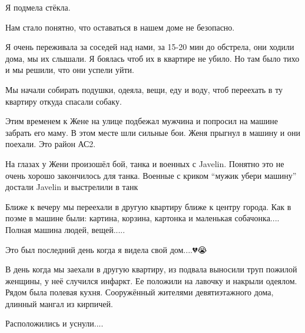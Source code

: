 
Я подмела стёкла.

Нам стало понятно, что оставаться в нашем доме не безопасно. 

Я очень переживала за соседей над нами, за 15-20 мин до обстрела, они ходили
дома, мы их слышали. Я боялась чтоб их в квартире не убило. Но там было тихо и
мы решили, что они успели уйти. 


Мы начали собирать подушки, одеяла, вещи, еду и воду, чтоб переехать в ту
квартиру откуда спасали собаку. 

Этим временем к Жене на улице подбежал мужчина и попросил на машине забрать его
маму. В этом месте шли сильные бои. Женя прыгнул в машину и они поехали. Это
район АС2. 

На глазах у Жени произошёл бой, танка и военных с Javelin. Понятно это не очень
хорошо закончилось для танка. Военные с криком \enquote{мужик убери машину} достали
Javelin и выстрелили в танк

Ближе к вечеру мы переехали в другую квартиру ближе к центру города. Как в
поэме в машине были: картина, корзина, картонка и маленькая собачонка....  Полная
машина людей, вещей.....


Это был последний день когда я видела свой дом....💔😭

В день когда мы заехали в другую квартиру, из подвала выносили труп пожилой
женщины, у неё случился инфаркт. Ее положили на лавочку и накрыли одеялом.
Рядом была полевая кухня. Сооружённый жителями девятиэтажного дома, длинный
мангал из кирпичей. 

Расположились и уснули....



